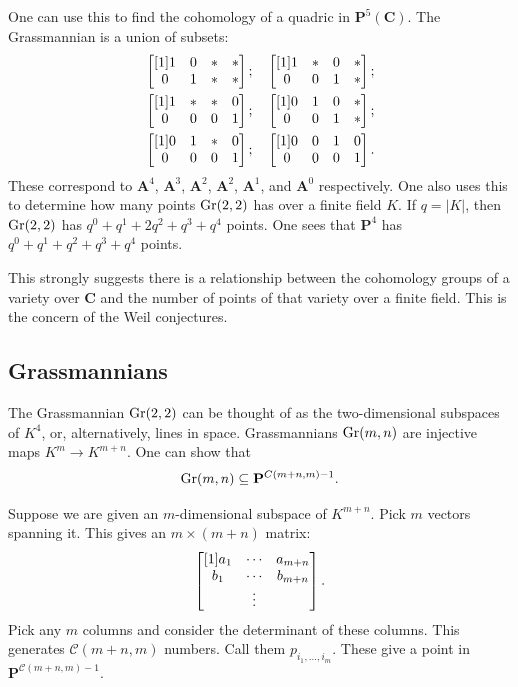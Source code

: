 \documentclass [11 pt, oneside] {article}
\begin{document}
One can use this to find the cohomology of a quadric in $\mathbf{P}^5(\mathbf{C})$. The Grassmannian is a union of subsets:
\begin{align*}
	&\begin{bmatrix} [1] 1&0&*&*\\0&1&*&*\end{bmatrix};
	\quad\begin{bmatrix} [1] 1&*&0&*\\0&0&1&*\end{bmatrix};\\
	&\begin{bmatrix} [1] 1&*&*&0\\0&0&0&1\end{bmatrix};
	\quad\begin{bmatrix} [1] 0&1&0&*\\0&0&1&*\end{bmatrix};\\
	&\begin{bmatrix} [1] 0&1&*&0\\0&0&0&1\end{bmatrix};
	\quad\begin{bmatrix} [1] 0&0&1&0\\0&0&0&1\end{bmatrix}.
\end{align*}
These correspond to $\mathbf{A}^4$, $\mathbf{A}^3$, $\mathbf{A}^2$, $\mathbf{A}^2$, $\mathbf{A}^1$, and $\mathbf{A}^0$ respectively. One also uses this to determine how many points $\operatorname{Gr}(2,2)$ has over a finite field $K$. If $q=\left\lvert K \right\rvert $, then $\operatorname{Gr}(2,2)$ has $q^0 + q^1 + 2q^2 + q^3+q^4$ points. One sees that $\mathbf{P}^4$ has $q^0+q^1+q^2+q^3+q^4$ points.

This strongly suggests there is a relationship between the cohomology groups of a variety over $\mathbf{C}$ and the number of points of that variety over a finite field. This is the concern of the Weil conjectures.

\subsection{Grassmannians}
The Grassmannian $\operatorname{Gr}(2,2)$ can be thought of as the two-dimensional subspaces of $K^4$, or, alternatively, lines in space. Grassmannians $\operatorname{Gr}(m,n)$ are injective maps $K^m \longrightarrow K^{m+n}$.
One can show that
\begin{align*}
	\operatorname{Gr}(m,n) \subseteq  \mathbf{P}^{\relax{C}({m+n},{m})-1}.
\end{align*}

Suppose we are given an $m$-dimensional subspace of $K^{m+n}$. Pick $m$ vectors spanning it. This gives an $m\times(m+n)$ matrix:
\begin{align*}
	\begin{bmatrix} [1] a_1&\cdots &a_{m+n}\\b_1&\cdots &b_{m+n}\\&\vdots\end{bmatrix}.
\end{align*}
Pick any $m$ columns and consider the determinant of these columns. This generates $\mathscr{C}({m+n},{m})$ numbers. Call them $p_{{i_1},\hdots,{i_m}}$. These give a point in $\mathbf{P}^{\mathscr{C}({m+n},{m}) - 1}$. 
\end{document}
